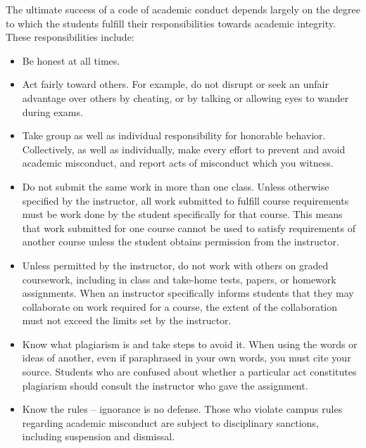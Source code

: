 \documentclass{article}
\begin{document}
The ultimate success of a code of academic conduct depends largely on
the degree to which the students fulfill their responsibilities
towards academic integrity.  These responsibilities include:
\begin{itemize}

\item Be honest at all times.

\item Act fairly toward others. For example, do not disrupt or seek an
  unfair advantage over others by cheating, or by talking or allowing
  eyes to wander during exams.

\item Take group as well as individual responsibility for honorable
  behavior.  Collectively, as well as individually, make every effort
  to prevent and avoid academic misconduct, and report acts of
  misconduct which you witness.

\item Do not submit the same work in more than one class. Unless
  otherwise specified by the instructor, all work submitted to fulfill
  course requirements must be work done by the student specifically
  for that course.  This means that work submitted for one course
  cannot be used to satisfy requirements of another course unless the
  student obtains permission from the instructor.

\item Unless permitted by the instructor, do not work with others on
  graded coursework, including in class and take-home tests, papers,
  or homework assignments. When an instructor specifically informs
  students that they may collaborate on work required for a course,
  the extent of the collaboration must not exceed the limits set by
  the instructor.

\item Know what plagiarism is and take steps to avoid it. When using
  the words or ideas of another, even if paraphrased in your own
  words, you must cite your source. Students who are confused about
  whether a particular act constitutes plagiarism should consult the
  instructor who gave the assignment.

\item Know the rules -- ignorance is no defense. 
  Those who violate campus rules regarding academic misconduct are subject to
  disciplinary sanctions, including suspension and dismissal.

\end{itemize}

\newpage
\end{document}
